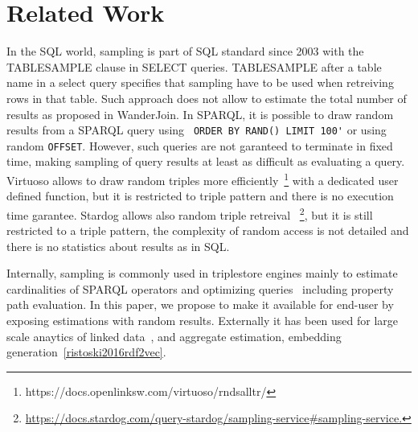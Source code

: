 

\section{Related Work}

In the SQL world, sampling is part of SQL standard since 2003 with the
TABLESAMPLE clause in SELECT
queries. TABLESAMPLE
after a table name in a select query specifies that sampling have to
be used when retreiving rows in that table. Such approach does not
allow to estimate the total number of results as proposed in
WanderJoin\cite{DBLP:journals/tods/LiWYZ19}.  In SPARQL, it is possible to draw random
results from a SPARQL query using \verb+ ORDER BY RAND() LIMIT 100'+
or using random \verb+OFFSET+. However, such queries are not garanteed
to terminate in fixed time, making sampling of query results at least as
difficult as evaluating a query. Virtuoso allows to draw
random triples more
efficiently~\footnote{https://docs.openlinksw.com/virtuoso/rndsalltr/}
with a dedicated user defined function, but it is restricted to triple
pattern and there is no execution time garantee. Stardog allows also
random triple retreival
~\footnote{\url{https://docs.stardog.com/query-stardog/sampling-service#sampling-service.}},
but it is still restricted to a triple pattern, the complexity of
random access is not detailed and there is no statistics about results
as in SQL.

Internally, sampling is commonly used in triplestore engines mainly to
estimate cardinalities of SPARQL operators and optimizing
queries~\cite{DBLP:conf/cidr/LeisRGK017} including property path evaluation\cite{10.1007/978-3-031-33455-9_3}. In this paper, we propose to
make it available for end-user by exposing estimations with random
results. Externally it has been used for large scale anaytics of
linked data~\cite{soulet2019anytime}, and aggregate
estimation\cite{li2016wanderjoin}, embedding generation~\ref{ristoski2016rdf2vec}.


